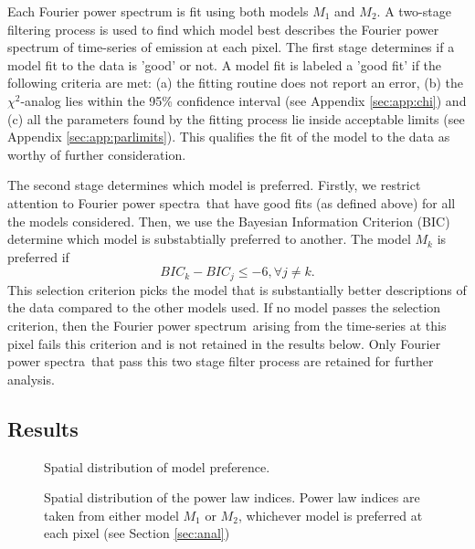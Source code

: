 \documentclass[onecolumn]{emulateapj}
\newcommand{\PS}{power spectrum}
\newcommand{\PA}{power spectra}
\newcommand{\Fps}{Fourier \PS}
\newcommand{\Fpa}{Fourier \PA}
\begin{document}
Each Fourier power spectrum is fit using both models $M_{1}$ and
$M_{2}$.  A two-stage filtering process is used to find which model
best describes the Fourier power spectrum of time-series of emission
at each pixel.  The first stage determines if a model fit to the data
is 'good' or not.  A model fit is labeled a 'good fit' if the
following criteria are met: (a) the fitting routine does not report an
error, (b) the $\chi^{2}$-analog lies within the 95\% confidence
interval (see Appendix \ref{sec:app:chi}) and (c) all the parameters
found by the fitting process lie inside acceptable limits (see
Appendix \ref{sec:app:parlimits}).  This qualifies the fit of the
model to the data as worthy of further consideration.

The second stage determines which model is preferred.  Firstly, we
restrict attention to \Fpa\ that have good fits (as defined above) for
all the models considered.  Then, we use the Bayesian Information
Criterion (BIC) determine which model is substabtially preferred to
another.  The model $M_{k}$ is preferred if
\begin{equation}
\label{eqn:bic}
BIC_{k} - BIC_{j} \le -6, \forall j\ne k.
\end{equation}
This selection criterion picks the model that is substantially better
descriptions of the data compared to the other models used.  If no
model passes the selection criterion, then the \Fps\ arising from the
time-series at this pixel fails this criterion and is not retained in
the results below.  Only \Fpa\ that pass this two stage filter process
are retained for further analysis.


\subsection{Results}\label{ssec:results}


\begin{figure}
\label{fig:spatialdistribution:preference}

\caption{Spatial distribution of model preference.}
\end{figure}



\begin{figure}
\label{fig:spatialdistribution:powerlawindex}

\caption{Spatial distribution of the power law indices.  Power law
  indices are taken from either model $M_{1}$ or $M_{2}$, whichever
  model is preferred at each pixel (see Section \ref{sec:anal})}
\end{figure}
\end{document}
